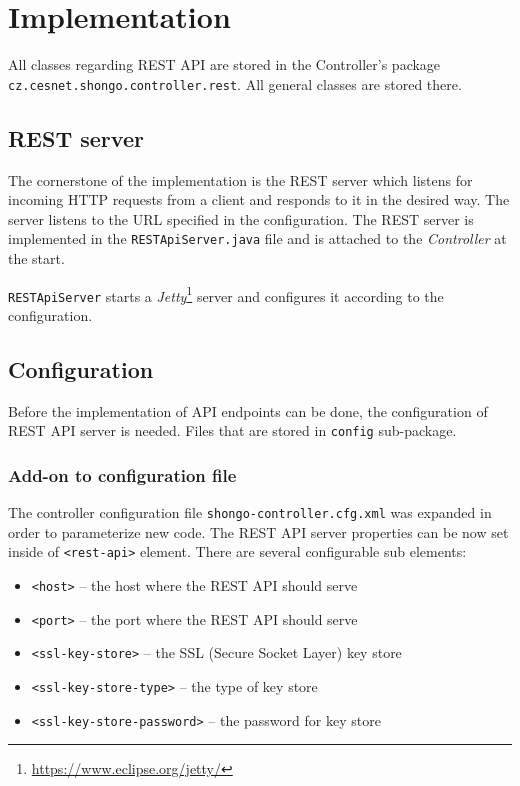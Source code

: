 \chapter{Implementation}
All classes regarding REST API are stored in the Controller's package \texttt{cz.cesnet.shongo.controller.rest}. All general classes are stored there.

\section{REST server}
The cornerstone of the implementation is the REST server which listens for incoming HTTP requests from a client and responds to it in the desired way. The server listens to the URL specified in the configuration. The REST server is implemented in the \texttt{RESTApiServer.java} file and is attached to the \emph{Controller} at the start.

\texttt{RESTApiServer} starts a \emph{Jetty}\footnote{\url{https://www.eclipse.org/jetty/}} server and configures it according to the configuration.

\section{Configuration}
Before the implementation of API endpoints can be done, the configuration of REST API server is needed. Files that are stored in \texttt{config} sub-package.
\subsection{Add-on to configuration file}
The controller configuration file \texttt{shongo-controller.cfg.xml}  was expanded in order to parameterize new code. The REST API server properties can be now set inside of \texttt{<rest-api>} element. There are several configurable sub elements:
\begin{itemize}
    \item \texttt{<host>} -- the host where the REST API should serve
    \item \texttt{<port>} -- the port where the REST API should serve
    \item \texttt{<ssl-key-store>} -- the SSL (Secure Socket Layer) key store
    \item \texttt{<ssl-key-store-type>} -- the type of key store
    \item \texttt{<ssl-key-store-password>} -- the password for key store
\end{itemize}

